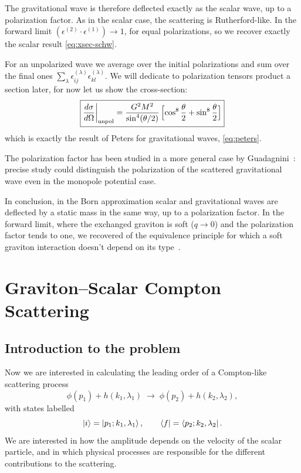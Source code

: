 \documentclass[12pt,a4paper,oneside]{article}
\numberwithin{equation}{section}   %
\begin{document}
The gravitational wave is therefore deflected exactly as the scalar wave, up to
a polarization factor. As in the scalar case, the scattering is Rutherford-like.
In the forward limit $(\epsilon^{(2)}\!\cdot\epsilon^{(1)})\to1$, for equal
polarizations, so we recover exactly the scalar result \eqref{eq:xsec-schw}.

For an unpolarized wave we average over the initial polarizations and sum over
the final ones
$\sum_\lambda\epsilon^{(\lambda)}_{ij}\epsilon^{(\lambda)}_{kl}$. We
will dedicate to polarization tensors product a section later, for now
let us show the cross-section:
\begin{equation}
    \label{eq:xsec-graviton-unpol}
    \boxed{
    \frac{d\sigma}{d\Omega}\bigg|_{\text{unpol}}
    = \frac{G^2M^2}{\sin^{4}(\theta/2)}\,
    \Bigl[\cos^{8}\frac{\theta}{2}+\sin^{8}\frac{\theta}{2}\Bigr]
    }
\end{equation}
which is exactly the result of Peters for gravitational waves, \eqref{eq:peters}.

The polarization factor has been studied in a more general case by Guadagnini~\cite{Guadagnini2008}:
precise study could distinguish the polarization of the scattered gravitational
wave even in the monopole potential case. 

In conclusion, in the Born approximation scalar and gravitational waves are
deflected by a static mass in the same way, up to a polarization factor.
In the forward limit, where the exchanged graviton is soft ($q\to0$) and the
polarization factor tends to one, we recovered of the equivalence
principle for which a soft graviton interaction doesn't depend on its type~\cite{Weinberg1995}.

\newpage
\section{Graviton--Scalar Compton Scattering}
\label{sec:compton}

\subsection{Introduction to the problem}

Now we are interested in calculating the leading order of a
Compton-like scattering process~\cite{GrossJackiw1968,DeWitt1967III,ChoiShimSong1995}
\begin{equation}
\phi(p_1)+h(k_1,\lambda_1)\;\longrightarrow\;\phi(p_2)+h(k_2,\lambda_2),
\end{equation}
with states labelled
\begin{equation}
\ket{i}=\ket{p_1;k_1,\lambda_1},
\qquad
\bra{f}=\bra{p_2;k_2,\lambda_2}.
\end{equation}
We are interested in how the amplitude depends on the velocity of the scalar
particle, and in which physical processes are responsible for the different
contributions to the scattering.
\end{document}
